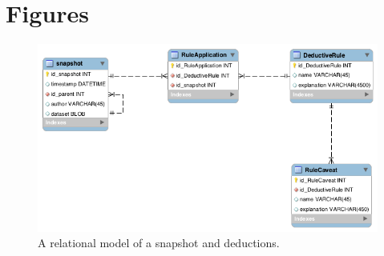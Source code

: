 \clearpage
\section{Figures}

\begin{figure}[h]
  \includegraphics[scale=0.5]{figures/deduction_model}
  \caption{A relational model of a snapshot and deductions.}
  \label{deduction_model}
\end{figure}

